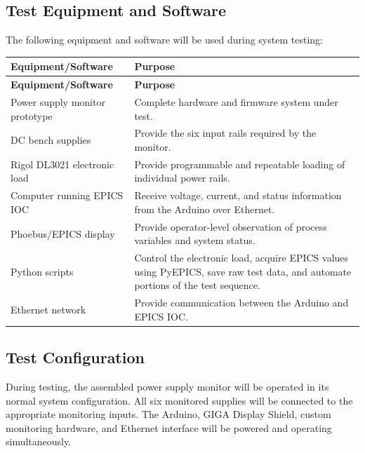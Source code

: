 \subsection{Test Equipment and Software}

The following equipment and software will be used during system testing:

\renewcommand{\arraystretch}{1.3}
\begin{longtable}{p{} p{}}
    \toprule
    \textbf{Equipment/Software} & \textbf{Purpose} \\
    \midrule
    \endfirsthead

    \toprule
    \textbf{Equipment/Software} & \textbf{Purpose} \\
    \midrule
    \endhead

    Power supply monitor prototype &
    Complete hardware and firmware system under test. \\

    DC bench supplies &
    Provide the six input rails required by the monitor. \\

    Rigol DL3021 electronic load &
    Provide programmable and repeatable loading of individual power rails. \\

    Computer running EPICS IOC &
    Receive voltage, current, and status information from the Arduino over Ethernet. \\

    Phoebus/EPICS display &
    Provide operator-level observation of process variables and system status. \\

    Python scripts &
    Control the electronic load, acquire EPICS values using PyEPICS, save raw
    test data, and automate portions of the test sequence. \\

    Ethernet network &
    Provide communication between the Arduino and EPICS IOC. \\

    \bottomrule
\end{longtable}

\subsection{Test Configuration}

During testing, the assembled power supply monitor will be operated in its normal
system configuration. All six monitored supplies will be connected to the appropriate
monitoring inputs. The Arduino, GIGA Display Shield, custom monitoring hardware,
and Ethernet interface will be powered and operating simultaneously.

